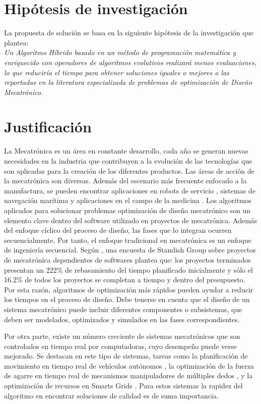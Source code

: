   \section{Hipótesis de investigación}
  La propuesta de solución se basa en la siguiente hipótesis de la investigación que plantea:\\
\textit{  Un Algoritmo Híbrido basado en un método de programación matemática y enriquecido con operadores de algoritmos evolutivos realizará menos evaluaciones, lo que reduciría el tiempo para obtener soluciones iguales o mejores a las reportadas en la literatura especializada de problemas de optimización de Diseño Mecatrónico.}
  
  \section{Justificación}
  
  La Mecatrónica es un área en constante desarrollo, cada año se generan nuevas necesidades en la industria que contribuyen a la evolución de las tecnologías que son aplicadas para la creación de los diferentes productos. Las áreas de acción de la mecatrónica son diversas. Además del escenario más frecuente enfocado a la manufactura, se pueden encontrar aplicaciones en robots de servicio  \cite{munaro2014fast} \cite{jiang2015novel}, sistemas de navegación marítima \cite{shi2017advanced}  y aplicaciones en el campo de la medicina \cite{burgner2015continuum}. Los algoritmos aplicados para solucionar problemas optimización de diseño mecatrónico son un elemento clave dentro del software utilizado en proyectos de mecatrónica. Además del enfoque cíclico del proceso de diseño, las fases que lo integran ocurren secuencialmente. Por tanto, el enfoque tradicional en mecatrónica es un enfoque de ingeniería secuencial. Según \cite{shetty_mechatronics_2010}, una encuesta de Standish Group sobre proyectos de mecatrónica dependientes de softwares plantea que: los proyectos terminados presentan un 222\% de rebasamiento del tiempo planificado inicialmente y sólo el 16.2\% de todos los proyectos se completan a tiempo y dentro del presupuesto. Por esta razón, algoritmos de optimización más rápidos pueden ayudar a reducir los tiempos en el proceso de diseño. Debe tenerse en cuenta que el diseño de un sistema mecatrónico puede incluir diferentes componentes o subsistemas, que deben ser modelados, optimizados y simulados en las fases correspondientes.
  
  Por otra parte, existe un número creciente de sistemas mecatrónicos que son controlados en tiempo real por computadoras, cuyo desempeño puede verse mejorado. Se destacan en este tipo de sistemas, tareas como la planificación de movimiento en tiempo real de vehículos autónomos \cite{frazzoli_real-time_2002},  la optimización de la fuerza de agarre en tiempo real  de mecanismos manipuladores de múltiples dedos \cite{liu_real-time_2004}, y la optimización de recursos en Smarts Grids \cite{kumar2017smart} \cite{ahat2013smart} \cite{mortaji2016smart}. Para estos sistemas la rapidez del algoritmo en encontrar soluciones de calidad es de suma importancia.
  
